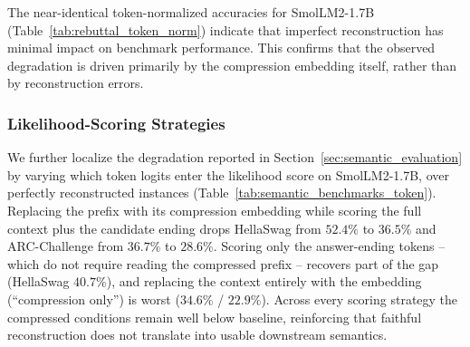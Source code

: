 The near-identical token-normalized accuracies for SmolLM2-1.7B (Table~\ref{tab:rebuttal_token_norm}) indicate that imperfect reconstruction has minimal impact on benchmark performance. This confirms that the observed degradation is driven primarily by the compression embedding itself, rather than by reconstruction errors.

\begin{table}[t]
\centering
\caption{Token-normalized accuracy (\%) for HellaSwag, ARC-Easy, and ARC-Challenge on SmolLM2-1.7B. Values are reported for perfectly reconstructed examples and for all examples.}
\label{tab:rebuttal_token_norm}
\begin{small}

\end{small}
\end{table}

\subsubsection{Likelihood-Scoring Strategies}
\label{app:scoring_strategies}

We further localize the degradation reported in Section~\ref{sec:semantic_evaluation} by varying which token logits enter the likelihood score on SmolLM2-1.7B, over perfectly reconstructed instances (Table~\ref{tab:semantic_benchmarks_token}).
Replacing the prefix with its compression embedding while scoring the full context plus the candidate ending drops HellaSwag from $52.4\%$ to $36.5\%$ and ARC-Challenge from $36.7\%$ to $28.6\%$.
Scoring only the answer-ending tokens -- which do not require reading the compressed prefix -- recovers part of the gap (HellaSwag $40.7\%$), and replacing the context entirely with the embedding (``compression only'') is worst ($34.6\%$ / $22.9\%$).
Across every scoring strategy the compressed conditions remain well below baseline, reinforcing that faithful reconstruction does not translate into usable downstream semantics.

\begin{table}[t]
    \centering
    \caption{Token-normalized accuracy (\%) on HellaSwag, ARC-Easy (ARC-E), and ARC-Challenge (ARC-C) for SmolLM2-1.7B under different likelihood-scoring strategies, over perfectly reconstructed instances. \emph{Baseline} uses the original prefix; \emph{Compression} replaces the prefix with its crammed embedding; \emph{compression only} drops the prefix and keeps only the embedding. ``context $+$ ending'' scores all tokens, while ``ending only'' scores just the candidate-continuation tokens.}
    \label{tab:semantic_benchmarks_token}
    \begin{small}
    
    \end{small}
\end{table}


